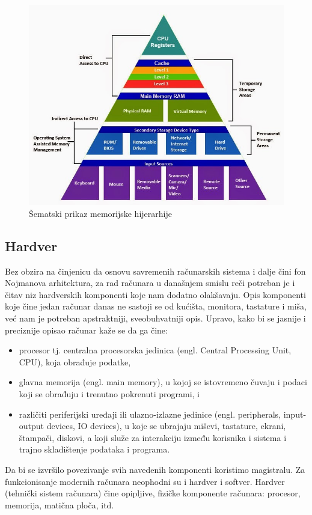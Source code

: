 \documentclass[a4paper]{article}
\begin{document}
\begin{figure}[h!]
\begin{center}
\includegraphics[scale=0.5]{pictures/mem_hijer.jpg}
\end{center}
\caption{Šematski prikaz memorijske hijerarhije}
\label{fig:memh}
\end{figure}

\subsection{Hardver}
Bez obzira na činjenicu da osnovu savremenih računarskih sistema i dalje čini fon Nojmanova arhitektura, za rad računara u današnjem smislu reči potreban je i čitav niz hardverskih komponenti koje nam dodatno olakšavaju. Opis komponenti koje čine jedan računar danas ne sastoji se od kućišta, monitora, tastature i miša, već nam je potreban apstraktniji, sveobuhvatniji opis. Upravo, kako bi se jasnije i preciznije opisao računar kaže se da ga čine:
\begin{itemize}
\item procesor tj. centralna procesorska jedinica (engl. Central Processing Unit,
CPU), koja obrađuje podatke,
\item glavna memorija (engl. main memory), u kojoj se istovremeno čuvaju i
podaci koji se obrađuju i trenutno pokrenuti programi, i 
\item različiti periferijski uređaji ili ulazno-izlazne jedinice (engl. peripherals,
input-output devices, IO devices), u koje se ubrajaju miševi, tastature, ekrani,
štampači, diskovi, a koji služe za interakciju između korisnika i sistema i trajno skladištenje podataka i programa.
\end{itemize} 
Da bi se izvršilo povezivanje svih navedenih komponenti koristimo magistralu.
Za funkcionisanje modernih računara neophodni su i hardver i softver. 
Hardver (tehnički sistem računara) čine opipljive, fizičke komponente računara: procesor, memorija, matična ploča, itd. 
\end{document}

